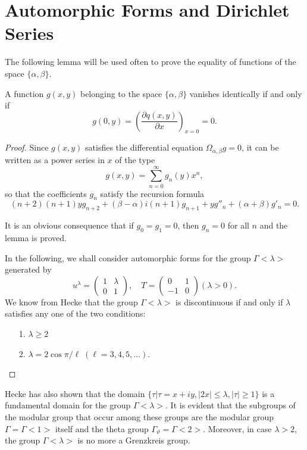 \section{Automorphic Forms and Dirichlet Series}\label{chap5:sec2}

The following lemma will be used often to prove the equality of
functions of the space $\{\alpha,\beta\}$.

\setcounter{lem}{8}
\begin{lem}\label{chap5:lem9}
A function $g(x,y)$ belonging to the space $\{\alpha,\beta\}$ vanishes
identically if and only if
$$
g(0,y) = \left(\frac{\partial q (x,y)}{\partial x}\right)_{x=0} = 0.
$$
\end{lem}

\begin{proof}
Since $g(x,y)$ satisfies the differential equation
$\Omega_{\alpha,\beta}g=0$, it can be written as a power series in $x$
of the type
$$
g(x,y) = \sum^{\infty}_{n=0} g_n(y) x^n,
$$
so that the coefficients $g_n$ satisfy the recursion formula
$$
(n+2)(n+1) y g_{n+2} + (\beta-\alpha) i(n+1)g_{n+1} + y g''_n +
(\alpha+\beta) g'_n = 0.
$$

It is an obvious consequence that if $g_0=g_1=0$, then $g_n=0$ for all
$n$ and the lemma is proved.

In the following, we shall consider automorphic forms for the group
$\Gamma<\lambda>$ generated by
$$
u^{\lambda} = \begin{pmatrix}
1&\lambda\\
0&1
\end{pmatrix} , \quad T = \begin{pmatrix}
0&1\\
-1&0
\end{pmatrix} (\lambda>0).
$$
We know from Hecke that the group $\Gamma<\lambda>$ is discontinuous
if and only if $\lambda$ satisfies any one of the two conditions:
\begin{itemize}
\item[1.] $\lambda \geq 2$

\item[2.] $\lambda=2 \cos \pi/\ell \; (\ell=3,4,5,\ldots)$.
\end{itemize}
\end{proof}

Hecke \pageoriginale has also shown that the domain $\{\tau|\tau=x+iy,
|2x| \leq \lambda, |\tau| \geq 1\}$ is a fundamental domain for the
group $\Gamma<\lambda>$. It is evident that the subgroups of the
modular group that occur among these groups are the modular group
$\Gamma=\Gamma<1>$ itself and the theta group
$\Gamma_{\vartheta}=\Gamma<2>$. Moreover, in case $\lambda>2$, the
group $\Gamma<\lambda>$ is no more a Grenzkreis group.

